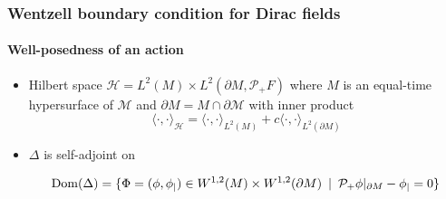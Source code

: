 \documentclass[french]{beamer}
\newcommand{\dom}{\mathrm{Dom}}
\begin{document}
\begin{frame}[shrink=10]
\frametitle{Wentzell boundary condition for Dirac fields}
\framesubtitle{Well-posedness of an action}

\begin{itemize}

\item Hilbert space $\mathcal{H} = L^{2}(M)\times L^{2}(\partial M, \mathcal{P}_+ F)$
where $M$ is an equal-time hypersurface of $\mathcal{M}$ and $\partial M = M\cap \partial \mathcal{M}$ with inner product
\begin{equation*}
\langle \cdot, \cdot \rangle _\mathcal{H} = \langle \cdot, \cdot \rangle _{L^2(M)} + c \langle \cdot, \cdot \rangle _{L^2(\partial M)}
\end{equation*}

\item $\Delta$ is self-adjoint on 

\begin{equation*}
\dom( \Delta) = \{ \Phi = (\phi, \phi_|) \in W^{1,2}(M)\times W^{1,2}(
\partial M) \enskip | \enskip \mathcal{P}_+\phi \vert_{\partial M} - \phi_| = 0 \} 
\end{equation*}  

\end{itemize}

\end{frame}
\end{document}
